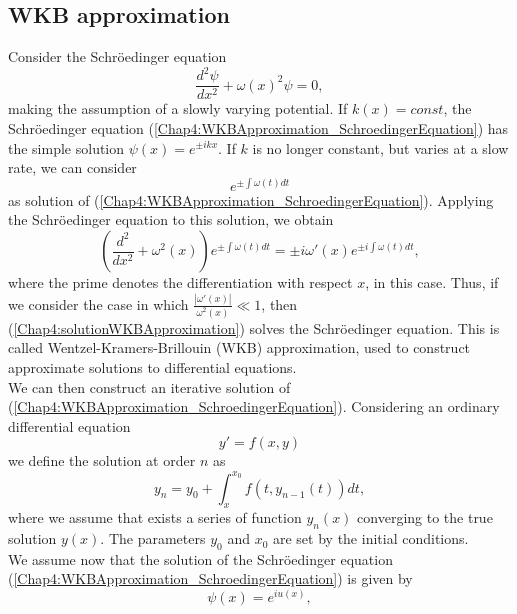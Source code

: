 \documentclass[11pt,a4paper,twoside]{book}
\begin{document}
\subsection{WKB approximation}
Consider the Schr\"{o}edinger equation
\begin{equation}
\label{Chap4:WKBApproximation_SchroedingerEquation}
\frac{d^{2}\psi}{dx^{2}} + \omega(x)^{2}\psi = 0,
\end{equation}
making the assumption of a slowly varying potential. If $ k(x)=const $, the Schr\"{o}edinger equation (\ref{Chap4:WKBApproximation_SchroedingerEquation}) has the simple solution $ \psi(x)=e^{\pm ikx} $. If $ k $ is no longer constant, but varies at a slow rate, we can consider 
\begin{equation}
	\label{Chap4:solutionWKBApproximation}
	e^{\pm \int \omega(t)dt}
\end{equation}
as solution of (\ref{Chap4:WKBApproximation_SchroedingerEquation}).
Applying the Schr\"{o}edinger equation to this solution, we obtain
\begin{equation}
\label{Chap4:SchroedingerApplied}
(\dfrac{d^{2}}{dx^{2}} + \omega^{2}(x))e^{\pm \int \omega(t)dt} = \pm i\omega'(x)e^{\pm i \int \omega(t) dt},
\end{equation}
where the prime denotes the differentiation with respect $ x $, in this case.
Thus, if we consider the case in which $ \frac{|\omega'(x)|}{\omega^{2}(x)} \ll 1 $, then (\ref{Chap4:solutionWKBApproximation}) solves the Schr\"{o}edinger equation. This is called Wentzel-Kramers-Brillouin (WKB) approximation, used to construct  approximate solutions to differential equations.\\
We can then construct an iterative solution of (\ref{Chap4:WKBApproximation_SchroedingerEquation}). Considering an ordinary differential equation
\begin{equation}
y' = f(x,y)
\end{equation}
we define the solution at order $ n $ as 
\begin{equation}
	\label{Chap4:ConvergentSolutionInWKBApproximation}
	y_{n}=y_{0} + \int_{x}^{x_{0}} f(t,y_{n-1}(t))dt,
\end{equation}
where we assume that exists a series of function $ y_{n}(x) $ converging to the true solution $ y(x) $. The parameters $ y_{0} $ and $ x_{0} $ are set by the initial conditions.\\
We  assume now that the solution of the Schr\"{o}edinger equation (\ref{Chap4:WKBApproximation_SchroedingerEquation})  is given by 
\begin{equation}
	\psi(x)=e^{iu(x)},
\end{equation}
\end{document}

